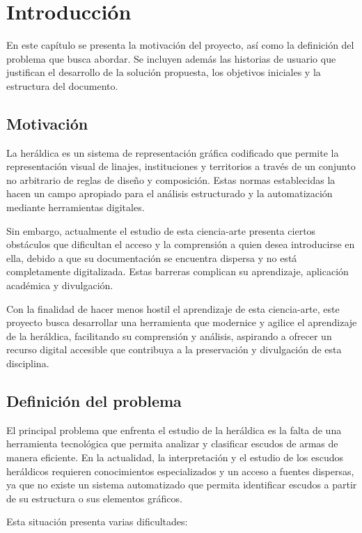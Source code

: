 \chapter{Introducción}

En este capítulo se presenta la motivación del proyecto, así como la definición
del problema que busca abordar. Se incluyen además las historias de usuario que
justifican el desarrollo de la solución propuesta, los objetivos iniciales y la
estructura del documento.

\section{Motivación}
La heráldica es un sistema de representación gráfica codificado que permite
la representación visual de linajes, instituciones y territorios a través de
un conjunto no arbitrario de reglas de diseño y composición. Estas normas
establecidas la hacen un campo apropiado para el análisis estructurado y la
automatización mediante herramientas digitales.

Sin embargo, actualmente el estudio de esta ciencia-arte presenta ciertos 
obstáculos que dificultan el acceso y la comprensión a quien desea
introducirse en ella, debido a que su documentación se encuentra dispersa y
no está completamente digitalizada. Estas barreras complican su aprendizaje,
aplicación académica y divulgación.

Con la finalidad de hacer menos hostil el aprendizaje de esta ciencia-arte, este
proyecto busca desarrollar una herramienta que modernice y agilice el aprendizaje
de la heráldica, facilitando su comprensión y análisis, aspirando a ofrecer un 
recurso digital accesible que contribuya a la preservación y divulgación de esta 
disciplina.

\section{Definición del problema}
El principal problema que enfrenta el estudio de la heráldica es la falta de una 
herramienta tecnológica que permita analizar y clasificar escudos de armas de manera 
eficiente. En la actualidad, la interpretación y el estudio de los escudos heráldicos 
requieren conocimientos especializados y un acceso a fuentes dispersas, ya que no
existe un sistema automatizado que permita identificar escudos a partir de
su estructura o sus elementos gráficos.

Esta situación presenta varias dificultades:

